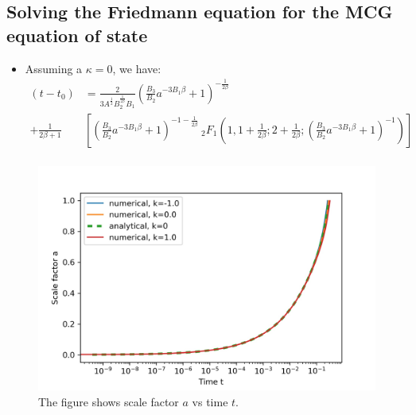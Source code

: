 \documentclass[8pt,hideothersubsections]{beamer}
\newcommand{\brac}[1]{\left(#1\right)}
\newcommand{\bracc}[1]{\left[#1\right]}
\begin{document}
\subsection{Solving the Friedmann equation for the MCG equation of state}
\begin{frame}
\begin{itemize}
\frametitle{\insertsectionhead}
\framesubtitle{\insertsubsectionhead}
\fontsize{7pt}{7.2}\selectfont
\item Assuming a $\kappa=0$, we have:
\fontsize{6pt}{7.2}\selectfont
\begin{equation}\label{eq:FmEqMCGSol}
\begin{split}
\brac{t-t_{0}}&=\frac{2}{3A^{\frac{1}{2}}B_{2}^{\frac{1}{2\beta}}B_{1}}\brac{\frac{B_{3}}{B_{2}}a^{-3B_{1}\beta}+1}^{-\frac{1}{2\beta}}\\
+\frac{1}{2\beta+1}&\bracc{\brac{\frac{B_{3}}{B_{2}}a^{-3B_{1}\beta}+1}^{-1-\frac{1}{2\beta}}\ _{2}F_{1}\brac{1,1+\frac{1}{2\beta};2+\frac{1}{2\beta};\brac{\frac{B_{3}}{B_{2}}a^{-3B_{1}\beta}+1}^{-1}}}\\
\end{split}
\end{equation}
\end{itemize}
\begin{figure}[H]
\centering
\includegraphics[scale=0.45]{Images/a_ch.jpg}
\caption{The figure shows scale factor $a$ vs time $t$.}
\label{fig:ChScale}
\end{figure}
\end{frame}
\end{document}
